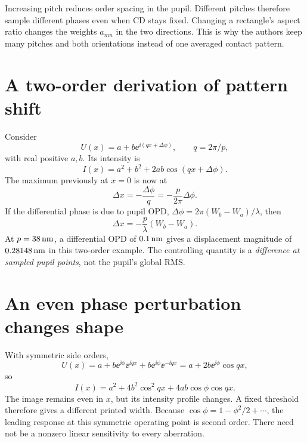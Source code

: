 
Increasing pitch reduces order spacing in the pupil. Different pitches
therefore sample different phases even when CD stays fixed.
Changing a rectangle's aspect ratio changes the weights $a_{mn}$ in
the two directions. This is why the authors keep many pitches and both
orientations instead of one averaged contact pattern.

\section{A two-order derivation of pattern shift}
Consider
\[
U(x)=a+b\ee^{\ii(qx+\Delta\phi)},\qquad q=2\pi/p,
\]
with real positive $a,b$. Its intensity is
\begin{equation}
I(x)=a^2+b^2+2ab\cos(qx+\Delta\phi).
\label{eq:twoorder}
\end{equation}
The maximum previously at $x=0$ is now at
\begin{equation}
\Delta x=-\frac{\Delta\phi}{q}
=-\frac{p}{2\pi}\Delta\phi.
\label{eq:fringeshift}
\end{equation}
If the differential phase is due to pupil OPD,
$\Delta\phi=2\pi(W_b-W_a)/\lambda$, then
\[
\Delta x=-\frac p\lambda(W_b-W_a).
\]
At $p=38\,\mathrm{nm}$, a differential OPD of $0.1\,\mathrm{nm}$ gives a displacement
magnitude of $0.28148\,\mathrm{nm}$ in this two-order example.
The controlling quantity is a \emph{difference at sampled pupil points},
not the pupil's global RMS.

\section{An even phase perturbation changes shape}
With symmetric side orders,
\[
U(x)=a+b\ee^{\ii\phi}\ee^{\ii qx}
+b\ee^{\ii\phi}\ee^{-\ii qx}
=a+2b\ee^{\ii\phi}\cos qx,
\]
so
\begin{equation}
I(x)=a^2+4b^2\cos^2qx+4ab\cos\phi\cos qx.
\label{eq:threeorder}
\end{equation}
The image remains even in $x$, but its intensity profile changes.
A fixed threshold therefore gives a different printed width.
Because $\cos\phi=1-\phi^2/2+\cdots$, the leading response at this
symmetric operating point is second order.
There need not be a nonzero linear sensitivity to every aberration.

